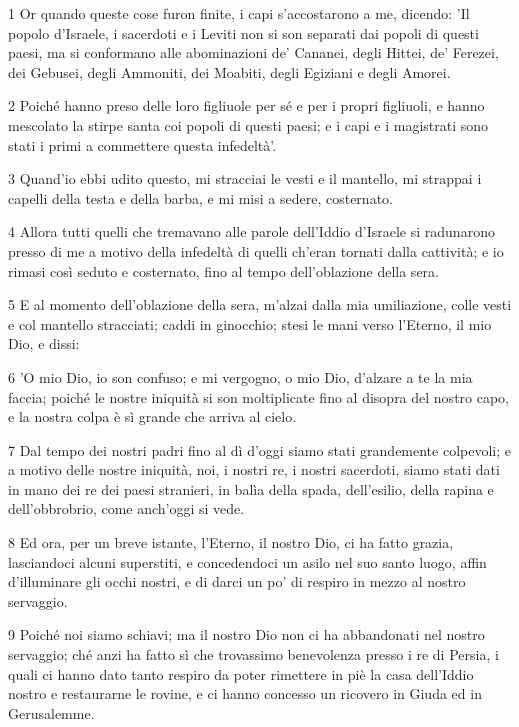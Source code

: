 \par 1 Or quando queste cose furon finite, i capi s'accostarono a me, dicendo: 'Il popolo d'Israele, i sacerdoti e i Leviti non si son separati dai popoli di questi paesi, ma si conformano alle abominazioni de' Cananei, degli Hittei, de' Ferezei, dei Gebusei, degli Ammoniti, dei Moabiti, degli Egiziani e degli Amorei.
\par 2 Poiché hanno preso delle loro figliuole per sé e per i propri figliuoli, e hanno mescolato la stirpe santa coi popoli di questi paesi; e i capi e i magistrati sono stati i primi a commettere questa infedeltà'.
\par 3 Quand'io ebbi udito questo, mi stracciai le vesti e il mantello, mi strappai i capelli della testa e della barba, e mi misi a sedere, costernato.
\par 4 Allora tutti quelli che tremavano alle parole dell'Iddio d'Israele si radunarono presso di me a motivo della infedeltà di quelli ch'eran tornati dalla cattività; e io rimasi così seduto e costernato, fino al tempo dell'oblazione della sera.
\par 5 E al momento dell'oblazione della sera, m'alzai dalla mia umiliazione, colle vesti e col mantello stracciati; caddi in ginocchio; stesi le mani verso l'Eterno, il mio Dio, e dissi:
\par 6 'O mio Dio, io son confuso; e mi vergogno, o mio Dio, d'alzare a te la mia faccia; poiché le nostre iniquità si son moltiplicate fino al disopra del nostro capo, e la nostra colpa è sì grande che arriva al cielo.
\par 7 Dal tempo dei nostri padri fino al dì d'oggi siamo stati grandemente colpevoli; e a motivo delle nostre iniquità, noi, i nostri re, i nostri sacerdoti, siamo stati dati in mano dei re dei paesi stranieri, in balìa della spada, dell'esilio, della rapina e dell'obbrobrio, come anch'oggi si vede.
\par 8 Ed ora, per un breve istante, l'Eterno, il nostro Dio, ci ha fatto grazia, lasciandoci alcuni superstiti, e concedendoci un asilo nel suo santo luogo, affin d'illuminare gli occhi nostri, e di darci un po' di respiro in mezzo al nostro servaggio.
\par 9 Poiché noi siamo schiavi; ma il nostro Dio non ci ha abbandonati nel nostro servaggio; ché anzi ha fatto sì che trovassimo benevolenza presso i re di Persia, i quali ci hanno dato tanto respiro da poter rimettere in piè la casa dell'Iddio nostro e restaurarne le rovine, e ci hanno concesso un ricovero in Giuda ed in Gerusalemme.
